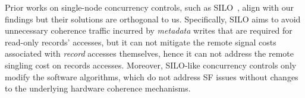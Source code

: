 Prior works on single-node concurrency controls, such as SILO~\cite{silo_sosp13}, align with our findings but their solutions are orthogonal to us. Specifically, SILO aims to avoid unnecessary coherence traffic incurred by \textit{metadata} writes that are required for read-only records' accesses, but it can not mitigate the remote signal costs associated with \textit{record} accesses themselves, hence it can not address the remote singling cost on records accesses. 
Moreover, SILO-like concurrency controls only modify the software algorithms, which do not address SF issues without changes to the underlying hardware coherence mechanisms. 






